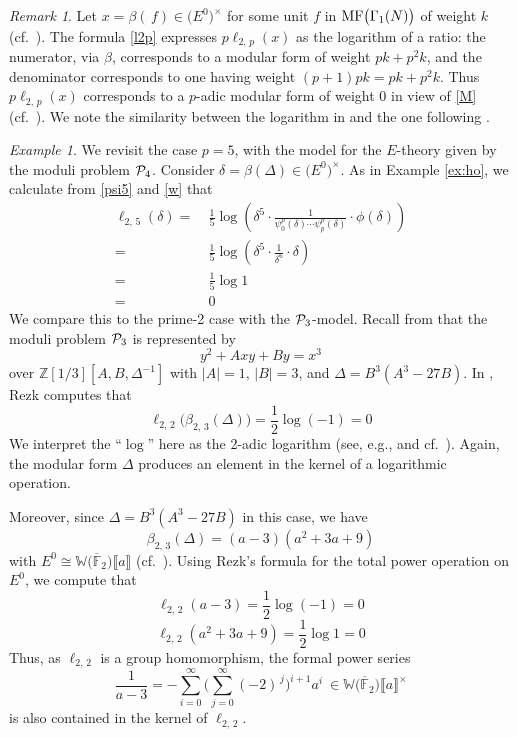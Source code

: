\documentclass{gtpart}
\theoremstyle{definition}
\theoremstyle{remark}
\newtheorem{rmk}[thm]{Remark}
\newtheorem{ex}[thm]{Example}
\newcommand{\mb}[1]{\mathbb{#1}}
\newcommand{\cF}{\overline {\mb F}}
\newcommand{\CP}{{\cal P}}
\newcommand{\BW}{{\mb W}}
\newcommand{\BZ}{{\mb Z}}
\newcommand{\MF}{{\rm MF}}
\newcommand{\B}{\beta}
\renewcommand{\D}{\Delta}
\renewcommand{\d}{\delta}
\newcommand{\G}{\Gamma}
\newcommand{\lb}{\llbracket}
\newcommand{\rb}{\rrbracket}
\renewcommand{\=}{\approx}
\renewcommand{\-}{\sim}
\numberwithin{equation}{section}
\numberwithin{thm}{section}
\begin{document}
\begin{rmk}
 \label{rmk:ratio}
 Let $x = \B(\,f) \in \big( E^0 \big)^{\!\times}$ for some unit $f$ in 
 $\MF\big(\G_1(N)\big)$ of weight $k$ (cf.~\cite{KubertLang}).  The formula 
 \eqref{l2p} expresses $p \ell_{2,\,p}(x)$ as the logarithm of a ratio: the 
 numerator, via $\B$, corresponds to a modular form of weight $p k + p^2 k$, and 
 the denominator corresponds to one having weight $(p + 1) p k = p k + p^2 k$.  
 Thus $p \ell_{2,\,p}(x)$ corresponds to a $p$-adic modular form of weight 0 in 
 view of \eqref{M} (cf.~\cite[Section 10.1]{padicinterp}).  We note the 
 similarity between the logarithm in \cite[10.2.7]{padicinterp} and the one 
 following \cite[Theorem 1.9]{log}.  
\end{rmk}

\begin{ex}
 \label{ex:log}
 We revisit the case $p = 5$, with the model for the $E$-theory given by the 
 moduli problem $\CP_4$.  Consider $\d = \B(\D) \in \big( E^0 \big)^{\!\times}$.  
 As in Example \ref{ex:ho}, we calculate from \eqref{psi5} and \eqref{w} that 
 \begin{equation*}
  \begin{split}
   \ell_{2,\,5}(\d) = & ~ \frac{1}{5} \log \left( \d^5 \cdot 
                        \frac{1}{\psi^p_0(\d) \cdots \psi^p_p(\d)} \cdot 
                        \phi(\d) \right) \\
                    = & ~ \frac{1}{5} \log \left( \d^5 \cdot \frac{1}{\d^6} 
                        \cdot \d \right) \\
                    = & ~ \frac{1}{5} \log 1 \\
                    = & ~ 0 
  \end{split}
 \end{equation*}
 We compare this to the prime-2 case with the $\CP_3$-model.  Recall from 
 \cite[Proposition 3.2]{tmf3} that the moduli problem $\CP_3$ is represented by 
 \[
  y^2 + A x y + B y = x^3 
 \]
 over $\BZ[1/3][A, B, \D^{-1}]$ with $|A| = 1$, $|B| = 3$, and 
 $\D = B^3 (A^3 - 27 B)$.  In \cite[2.8]{h2p2}, Rezk computes that 
 \[
  \ell_{2,\,2}\big(\B_{2,\,3}(\D)\big) = \frac{1}{2} \log(-1) = 0 
 \]
 We interpret the ``$\log$'' here as the 2-adic logarithm (see, e.g., 
 \cite[\S IV.1]{padic} and cf.~\cite[10.2.16]{padicinterp}).  Again, the modular 
 form $\D$ produces an element in the kernel of a logarithmic operation.  

 Moreover, since $\D = B^3 (A^3 - 27 B)$ in this case, we have 
 \[
  \B_{2,\,3}(\D) = (a - 3) (a^2 + 3 a + 9) 
 \]
 with $E^0 \cong \BW \big( \cF_2 \big) \lb a \rb$ (cf.~\cite[Section 4]{h2p2}).  
 Using Rezk's formula for the total power operation on $E^0$, we compute that 
 \[
  \ell_{2,\,2}(a - 3) = \frac{1}{2} \log(-1) = 0 
 \]
 \[
  \ell_{2,\,2}(a^2 + 3 a + 9) = \frac{1}{2} \log 1 = 0 
 \]
 Thus, as $\ell_{2,\,2}$ is a group homomorphism, the formal power series 
 \[
  \frac{1}{a - 3} = -\sum_{i = 0}^\infty 
                    \Big( \sum_{j = 0}^\infty (-2)^{\,j} \Big)^{\!i + 1} a^i ~ 
                    \in \BW \big( \cF_2 \big) \lb a \rb^\times 
 \]
 is also contained in the kernel of $\ell_{2,\,2}$.  


\end{ex}
\end{document}
